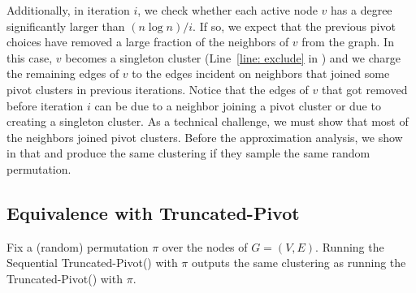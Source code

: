 \documentclass{theoretics}
\newcommand{\seqtruncatedpivot}{Sequential \textrm{Truncated-Pivot}\xspace}
\newcommand{\truncatedpivot}{\textrm{Truncated-Pivot}\xspace}
\begin{document}
Additionally, in iteration $i$, we check whether each active node $v$ has a degree significantly larger than $(n \log n)/i$.
If so, we expect that the previous pivot choices have removed a large fraction of the neighbors of $v$ from the graph.
In this case, $v$ becomes a singleton cluster (Line~\ref{line: exclude} in ) and we charge the remaining edges of $v$ to the edges incident on neighbors that joined some pivot clusters in previous iterations.
Notice that the edges of $v$ that got removed before iteration $i$ can be due to a neighbor joining a pivot cluster or due to creating a singleton cluster.
As a technical challenge, we must show that most of the neighbors joined pivot clusters. 
Before the approximation analysis, we show in  that  and  produce the same clustering if they sample the same random permutation.

\subsection{Equivalence with \truncatedpivot}


\begin{lemma} \label{lemma: seqvsparallel}
    Fix a (random) permutation $\pi$ over the nodes of $G = (V, E)$.
    Running the \seqtruncatedpivot () with $\pi$ outputs the same clustering as running the \truncatedpivot () with $\pi$.
\end{lemma}
\end{document}
